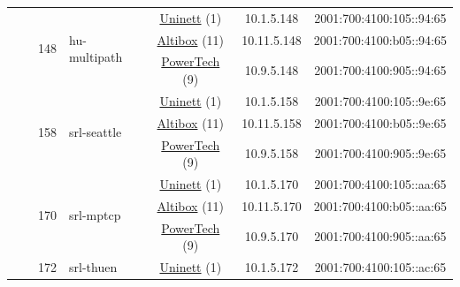 \begin{small}
\begin{center}
\begin{longtable}{|c|c|c|c|c|c|c|c|}
  &  & \multirow{3}{*}{\tiny{148}} & \multicolumn{1}{|l|}{\multirow{3}{*}{\tiny{hu-multipath}}} & \multicolumn{2}{|c|}{\tiny{\href{https://www.uninett.no}{Uninett} (1)}} & \tiny{10.1.5.148} & \tiny{2001:700:4100:105::94:65} \\* \cline{5-5}\cline{6-6}\cline{7-7}\cline{8-8}
  &  &  &  & \multicolumn{2}{|c|}{\tiny{\href{https://www.altibox.no}{Altibox} (11)}} & \tiny{10.11.5.148} & \tiny{2001:700:4100:b05::94:65} \\* \cline{5-5}\cline{6-6}\cline{7-7}\cline{8-8}
  &  &  &  & \multicolumn{2}{|c|}{\tiny{\href{http://www.powertech.no}{PowerTech} (9)}} & \tiny{10.9.5.148} & \tiny{2001:700:4100:905::94:65} \\* \cline{3-3}\cline{4-4}\cline{5-5}\cline{6-6}\cline{7-7}\cline{8-8}
  &  & \multirow{3}{*}{\tiny{158}} & \multicolumn{1}{|l|}{\multirow{3}{*}{\tiny{srl-seattle}}} & \multicolumn{2}{|c|}{\tiny{\href{https://www.uninett.no}{Uninett} (1)}} & \tiny{10.1.5.158} & \tiny{2001:700:4100:105::9e:65} \\* \cline{5-5}\cline{6-6}\cline{7-7}\cline{8-8}
  &  &  &  & \multicolumn{2}{|c|}{\tiny{\href{https://www.altibox.no}{Altibox} (11)}} & \tiny{10.11.5.158} & \tiny{2001:700:4100:b05::9e:65} \\* \cline{5-5}\cline{6-6}\cline{7-7}\cline{8-8}
  &  &  &  & \multicolumn{2}{|c|}{\tiny{\href{http://www.powertech.no}{PowerTech} (9)}} & \tiny{10.9.5.158} & \tiny{2001:700:4100:905::9e:65} \\* \cline{3-3}\cline{4-4}\cline{5-5}\cline{6-6}\cline{7-7}\cline{8-8}
  &  & \multirow{3}{*}{\tiny{170}} & \multicolumn{1}{|l|}{\multirow{3}{*}{\tiny{srl-mptcp}}} & \multicolumn{2}{|c|}{\tiny{\href{https://www.uninett.no}{Uninett} (1)}} & \tiny{10.1.5.170} & \tiny{2001:700:4100:105::aa:65} \\* \cline{5-5}\cline{6-6}\cline{7-7}\cline{8-8}
  &  &  &  & \multicolumn{2}{|c|}{\tiny{\href{https://www.altibox.no}{Altibox} (11)}} & \tiny{10.11.5.170} & \tiny{2001:700:4100:b05::aa:65} \\* \cline{5-5}\cline{6-6}\cline{7-7}\cline{8-8}
  &  &  &  & \multicolumn{2}{|c|}{\tiny{\href{http://www.powertech.no}{PowerTech} (9)}} & \tiny{10.9.5.170} & \tiny{2001:700:4100:905::aa:65} \\* \cline{3-3}\cline{4-4}\cline{5-5}\cline{6-6}\cline{7-7}\cline{8-8}
  &  & \multirow{3}{*}{\tiny{172}} & \multicolumn{1}{|l|}{\multirow{3}{*}{\tiny{srl-thuen}}} & \multicolumn{2}{|c|}{\tiny{\href{https://www.uninett.no}{Uninett} (1)}} & \tiny{10.1.5.172} & \tiny{2001:700:4100:105::ac:65} \\* \cline{5-5}\cline{6-6}\cline{7-7}\cline{8-8}

\end{longtable}
\end{center}
\end{small}
